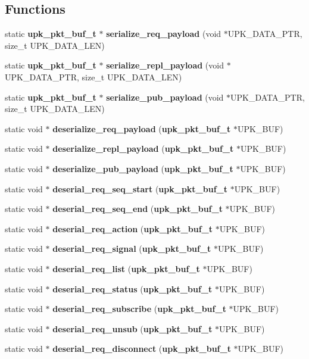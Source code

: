 \subsection*{Functions}
\begin{DoxyCompactItemize}
\item 
static {\bf upk\_\-pkt\_\-buf\_\-t} $\ast$ {\bf serialize\_\-req\_\-payload} (void $\ast$UPK\_\-DATA\_\-PTR, size\_\-t UPK\_\-DATA\_\-LEN)
\item 
static {\bf upk\_\-pkt\_\-buf\_\-t} $\ast$ {\bf serialize\_\-repl\_\-payload} (void $\ast$UPK\_\-DATA\_\-PTR, size\_\-t UPK\_\-DATA\_\-LEN)
\item 
static {\bf upk\_\-pkt\_\-buf\_\-t} $\ast$ {\bf serialize\_\-pub\_\-payload} (void $\ast$UPK\_\-DATA\_\-PTR, size\_\-t UPK\_\-DATA\_\-LEN)
\item 
static void $\ast$ {\bf deserialize\_\-req\_\-payload} ({\bf upk\_\-pkt\_\-buf\_\-t} $\ast$UPK\_\-BUF)
\item 
static void $\ast$ {\bf deserialize\_\-repl\_\-payload} ({\bf upk\_\-pkt\_\-buf\_\-t} $\ast$UPK\_\-BUF)
\item 
static void $\ast$ {\bf deserialize\_\-pub\_\-payload} ({\bf upk\_\-pkt\_\-buf\_\-t} $\ast$UPK\_\-BUF)
\item 
static void $\ast$ {\bf deserial\_\-req\_\-seq\_\-start} ({\bf upk\_\-pkt\_\-buf\_\-t} $\ast$UPK\_\-BUF)
\item 
static void $\ast$ {\bf deserial\_\-req\_\-seq\_\-end} ({\bf upk\_\-pkt\_\-buf\_\-t} $\ast$UPK\_\-BUF)
\item 
static void $\ast$ {\bf deserial\_\-req\_\-action} ({\bf upk\_\-pkt\_\-buf\_\-t} $\ast$UPK\_\-BUF)
\item 
static void $\ast$ {\bf deserial\_\-req\_\-signal} ({\bf upk\_\-pkt\_\-buf\_\-t} $\ast$UPK\_\-BUF)
\item 
static void $\ast$ {\bf deserial\_\-req\_\-list} ({\bf upk\_\-pkt\_\-buf\_\-t} $\ast$UPK\_\-BUF)
\item 
static void $\ast$ {\bf deserial\_\-req\_\-status} ({\bf upk\_\-pkt\_\-buf\_\-t} $\ast$UPK\_\-BUF)
\item 
static void $\ast$ {\bf deserial\_\-req\_\-subscribe} ({\bf upk\_\-pkt\_\-buf\_\-t} $\ast$UPK\_\-BUF)
\item 
static void $\ast$ {\bf deserial\_\-req\_\-unsub} ({\bf upk\_\-pkt\_\-buf\_\-t} $\ast$UPK\_\-BUF)
\item 
static void $\ast$ {\bf deserial\_\-req\_\-disconnect} ({\bf upk\_\-pkt\_\-buf\_\-t} $\ast$UPK\_\-BUF)
\item 

\end{DoxyCompactItemize}
